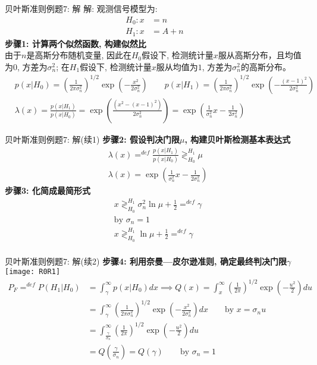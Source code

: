 \begin{frame}[shrink]{贝叶斯准则例题7: 解}
解: 观测信号模型为:
\begin{align*}
H_0: x&=n  \\
H_1: x&=A+n
\end{align*}
\textbf{步骤1: 计算两个似然函数, 构建似然比}\\
由于$n$是高斯分布随机变量, 因此在$H_0$假设下, 检测统计量$x$服从高斯分布，且均值为0, 方差为$\sigma_n^2$; 在$H_1$假设下, 检测统计量$x$服从均值为$1$, 方差为$\sigma_n^2$的高斯分布。
\begin{align*}
&p(x|H_0)=\left(\frac{1}{2\pi\sigma_n^2}\right)^{1/2}\exp\left(-\frac{x^2}{2\sigma_n^2}\right) \qquad p(x|H_1)=\left(\frac{1}{2\pi\sigma_n^2}\right)^{1/2}\exp\left(-\frac{(x-1)^2}{2\sigma_n^2}\right)\\
&\lambda(x)=\frac{p(x|H_1)}{p(x|H_0)}=\exp\left(\frac{(x^2-(x-1)^2)}{2\sigma_n^2}\right)=\exp\left(\frac{1}{\sigma_n^2}x-\frac{1}{2\sigma_n^2}\right)
\end{align*} 
\end{frame}

\begin{frame}[shrink]{贝叶斯准则例题7: 解(续1)}
\textbf{步骤2: 假设判决门限$\mu$, 构建贝叶斯检测基本表达式}
\begin{align*}
&\lambda(x)\mathop{=}^{def}\frac{p(x|H_1)}{p(x|H_0)}\mathop{\gtrless}_{H_0}^{H_1}\mu\\
&\lambda(x)=\exp\left(\frac{1}{\sigma_n^2}x-\frac{1}{2\sigma_n^2}\right)
\end{align*} 
\textbf{步骤3: 化简成最简形式}
\begin{align*}
&x\mathop{\gtrless}_{H_0}^{H_1}\sigma_n^2\ln\mu+\frac{1}{2}\mathop{=}^{def}\gamma\\
&\text{by }\sigma_n=1\\
&x\mathop{\gtrless}_{H_0}^{H_1}\ln\mu+\frac{1}{2}\mathop{=}^{def}\gamma\\
\end{align*} 
\end{frame}

\begin{frame}[shrink]{贝叶斯准则例题7: 解(续2)}
\textbf{步骤4: 利用奈曼---皮尔逊准则, 确定最终判决门限$\gamma$}
\texttt{[image: R0R1]}
\begin{align*}
P_F\mathop{=}^{def}P(H_1|H_0)&=\int_{\gamma}^{\infty}p(x|H_0)dx\implies Q(x)=\int_{x}^{\infty}\left(\frac{1}{2\pi}\right)^{1/2}\exp\left(-\frac{u^2}{2}\right)du\\
&=\int_{\gamma}^{\infty}\left(\frac{1}{2\pi\sigma_n^2}\right)^{1/2}\exp\left(-\frac{x^2}{2\sigma_n^2}\right)dx\qquad \text{by } x=\sigma_nu\\
&=\int_{\frac{\gamma}{\sigma_n}}^{\infty}\left(\frac{1}{2\pi}\right)^{1/2}\exp\left(-\frac{u^2}{2}\right)du\\
&=Q\left(\frac{\gamma}{\sigma_n}\right)=Q(\gamma)\qquad \text{by }\sigma_n=1
\end{align*}
\end{frame}

